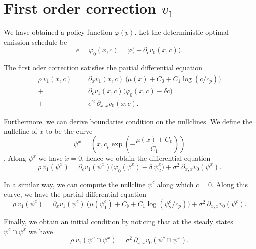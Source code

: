 \documentclass[../../main.tex]{subfiles}
\begin{document}
\section[First order correction]{First order correction $v_1$}

We have obtained a policy function $\varphi(p)$. Let the deterministic optimal emission schedule be \begin{equation}
    e = \varphi_0(x, c) = \varphi\Big(- \partial_c v_0(x, c)\Big).
\end{equation}

The first oder correction satisfies the partial differential equation \begin{equation}
    \begin{split}
        \rho \ v_1(x, c) = \ &\partial_x v_1(x, c) \ \Big(\mu(x) + C_0 + C_1 \log(c / c_p)\Big) \\
        + \ &\partial_c v_1(x, c) \Big( \varphi_0(x, c) - \delta c \Big) \\
        + \ &\sigma^2 \ \partial_{x, x} v_0(x, c).
    \end{split}
\end{equation}

Furthermore, we can derive boundaries condition on the nullclines. We define the nullcline of $x$ to be the curve \begin{equation}
    \psi^x = \left(x, c_p \exp\left(-\frac{\mu(x) + C_0}{C_1}\right) \right)
\end{equation}. Along $\psi^x$ we have $\dot x = 0$, hence we obtain the differential equation \begin{equation}
    \rho \ v_1(\psi^x) = \partial_c v_1(\psi^x) \Big( \varphi_0(\psi^x) - \delta \ \psi^x_2 \Big) + \sigma^2 \ \partial_{x, x} v_0(\psi^x).
\end{equation}

In a similar way, we can compute the nullcline $\psi^c$ along which $\dot{c} = 0$. Along this curve, we have the partial differential equation \begin{equation}
    \rho \ v_1(\psi^c) = \partial_x v_1(\psi^c) \ \Big(\mu(\psi^c_1) + C_0 + C_1 \log(\psi^c_2 / c_p)\Big) + \sigma^2 \ \partial_{x, x} v_0(\psi^c).
\end{equation}

Finally, we obtain an initial condition by noticing that at the steady states $\psi^c \cap \psi^x$ we have \begin{equation}
    \rho \ v_1(\psi^c \cap \psi^x) = \sigma^2 \ \partial_{x, x} v_0(\psi^c \cap \psi^x).
\end{equation}
\end{document}
